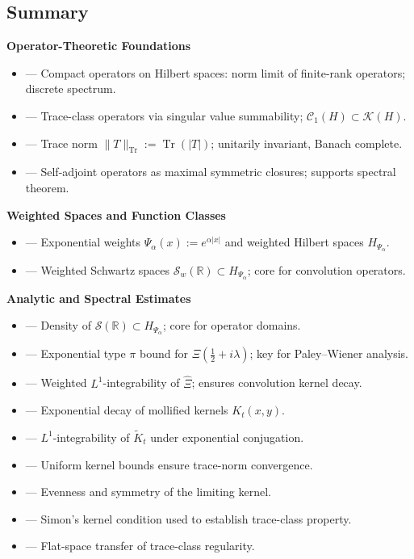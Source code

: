 \subsection*{Summary}
\label{sec:foundations-summary}

\textbf{Operator-Theoretic Foundations}
\begin{itemize}
  \item {} — Compact operators on Hilbert spaces: norm limit of finite-rank operators; discrete spectrum.
  \item {} — Trace-class operators via singular value summability; \( \mathcal{C}_1(H) \subset \mathcal{K}(H) \).
  \item {} — Trace norm \( \|T\|_{\operatorname{Tr}} := \operatorname{Tr}(|T|) \); unitarily invariant, Banach complete.
  \item {} — Self-adjoint operators as maximal symmetric closures; supports spectral theorem.
\end{itemize}

\textbf{Weighted Spaces and Function Classes}
\begin{itemize}
  \item {} — Exponential weights \( \Psi_\alpha(x) := e^{\alpha |x|} \) and weighted Hilbert spaces \( H_{\Psi_\alpha} \).
  \item {} — Weighted Schwartz spaces \( \mathcal{S}_w(\mathbb{R}) \subset H_{\Psi_\alpha} \); core for convolution operators.
\end{itemize}

\textbf{Analytic and Spectral Estimates}
\begin{itemize}
  \item {} — Density of \( \mathcal{S}(\mathbb{R}) \subset H_{\Psi_\alpha} \); core for operator domains.
  \item {} — Exponential type \( \pi \) bound for \( \Xi(\tfrac{1}{2} + i\lambda) \); key for Paley–Wiener analysis.
  \item {} — Weighted \( L^1 \)-integrability of \( \widehat{\Xi} \); ensures convolution kernel decay.
  \item {} — Exponential decay of mollified kernels \( K_t(x,y) \).
  \item {} — \( L^1 \)-integrability of \( \widetilde{K}_t \) under exponential conjugation.
  \item {} — Uniform kernel bounds ensure trace-norm convergence.
  \item {} — Evenness and symmetry of the limiting kernel.
  \item {} — Simon’s kernel condition used to establish trace-class property.
  \item {} — Flat-space transfer of trace-class regularity.
\end{itemize}

